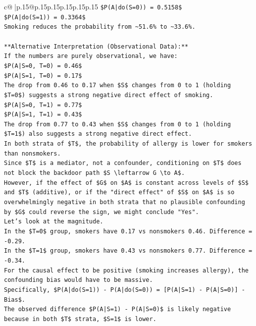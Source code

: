 \documentclass{article}
\begin{document}
{\begin{supertabular}{c@{$\;$}|p{.15\linewidth}@{}p{.15\linewidth}p{.15\linewidth}p{.15\linewidth}p{.15\linewidth}p{.15\linewidth}}
{{{\texttt{\$P(A|do(S=0)) = 0.5158\$} \\
\texttt{\$P(A|do(S=1)) = 0.3364\$} \\
\texttt{Smoking reduces the probability from \textasciitilde{}51.6\% to \textasciitilde{}33.6\%.} \\
\\ 
\texttt{**Alternative Interpretation (Observational Data):**} \\
\texttt{If the numbers are purely observational, we have:} \\
\texttt{\$P(A|S=0, T=0) = 0.46\$} \\
\texttt{\$P(A|S=1, T=0) = 0.17\$} \\
\texttt{The drop from 0.46 to 0.17 when \$S\$ changes from 0 to 1 (holding \$T=0\$) suggests a strong negative direct effect of smoking.} \\
\texttt{\$P(A|S=0, T=1) = 0.77\$} \\
\texttt{\$P(A|S=1, T=1) = 0.43\$} \\
\texttt{The drop from 0.77 to 0.43 when \$S\$ changes from 0 to 1 (holding \$T=1\$) also suggests a strong negative direct effect.} \\
\texttt{In both strata of \$T\$, the probability of allergy is lower for smokers than nonsmokers.} \\
\texttt{Since \$T\$ is a mediator, not a confounder, conditioning on \$T\$ does not block the backdoor path \$S \textbackslash{}leftarrow G \textbackslash{}to A\$.} \\
\texttt{However, if the effect of \$G\$ on \$A\$ is constant across levels of \$S\$ and \$T\$ (additive), or if the "direct effect" of \$S\$ on \$A\$ is so overwhelmingly negative in both strata that no plausible confounding by \$G\$ could reverse the sign, we might conclude "Yes".} \\
\texttt{Let's look at the magnitude.} \\
\texttt{In the \$T=0\$ group, smokers have 0.17 vs nonsmokers 0.46. Difference = {-}0.29.} \\
\texttt{In the \$T=1\$ group, smokers have 0.43 vs nonsmokers 0.77. Difference = {-}0.34.} \\
\texttt{For the causal effect to be positive (smoking increases allergy), the confounding bias would have to be massive.} \\
\texttt{Specifically, \$P(A|do(S=1)) {-} P(A|do(S=0)) = {[}P(A|S=1) {-} P(A|S=0){]} {-} Bias\$.} \\
\texttt{The observed difference \$P(A|S=1) {-} P(A|S=0)\$ is likely negative because in both \$T\$ strata, \$S=1\$ is lower.} \\
}}}
\end{supertabular}}
\end{document}
